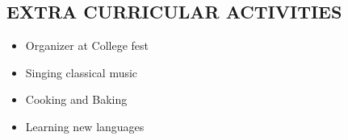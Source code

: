 \documentclass[line, margin]{res}
\begin{document}
\begin{resume}
\section{\bf EXTRA CURRICULAR ACTIVITIES}
\begin{itemize}
	\item Organizer at College fest  
	\item Singing classical music
	\item Cooking and Baking
	\item Learning new languages
\end{itemize}

\end{resume}
\end{document}
